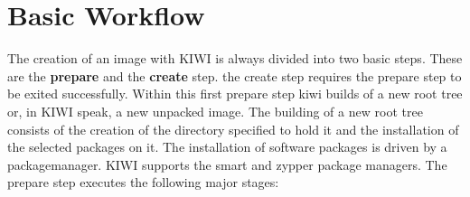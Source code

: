 \chapter{Basic Workflow}
\label{chapter:workflow}
\minitoc

The creation of an image with KIWI is always divided into two
basic steps. These are the \textbf{prepare} and the \textbf{create}
step. the create step requires the prepare step to be exited
successfully. Within this first prepare step kiwi builds of a new root
tree or, in KIWI speak, a new unpacked image. The building of a new
root tree consists of the creation of the directory specified to
hold it and the installation of the selected packages on it. The
installation of software packages is driven by a packagemanager.
KIWI supports the smart and zypper package managers. The prepare
step executes the following major stages:

